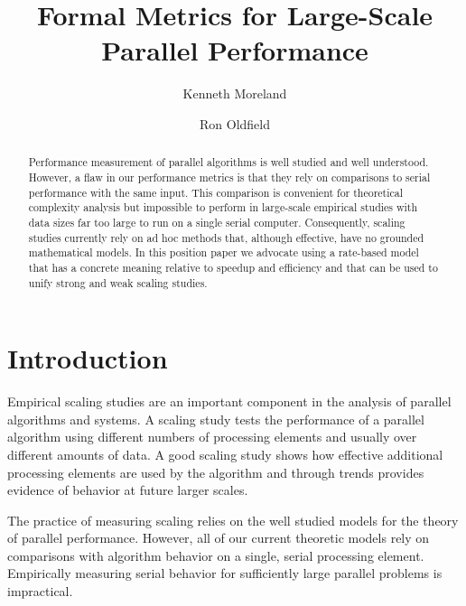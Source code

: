 \documentclass{llncs}
\begin{document}
\sloppy

%
\title{Formal Metrics for Large-Scale Parallel Performance}


\author{Kenneth Moreland \and Ron Oldfield}


\maketitle


\begin{abstract}
Performance measurement of parallel algorithms is well studied and well
understood. However, a flaw in our performance metrics is that they rely on
comparisons to serial performance with the same input. This comparison is
convenient for theoretical complexity analysis but impossible to perform in
large-scale empirical studies with data sizes far too large to run on a
single serial computer.  Consequently, scaling studies currently rely on ad
hoc methods that, although effective, have no grounded mathematical models.
In this position paper we advocate using a rate-based model that has a
concrete meaning relative to speedup and efficiency and that can be used to
unify strong and weak scaling studies.
\end{abstract}

\section{Introduction}

\noindent
Empirical scaling studies are an important component in the analysis of
parallel algorithms and systems. A scaling study tests the performance of a
parallel algorithm using different numbers of processing elements and
usually over different amounts of data. A good scaling study shows how
effective additional processing elements are used by the algorithm and
through trends provides evidence of behavior at future larger scales.

The practice of measuring scaling relies on the well studied models for the
theory of parallel performance. However, all of our current theoretic
models rely on comparisons with algorithm behavior on a single, serial
processing element. Empirically measuring serial behavior for sufficiently
large parallel problems is impractical.
\end{document}
